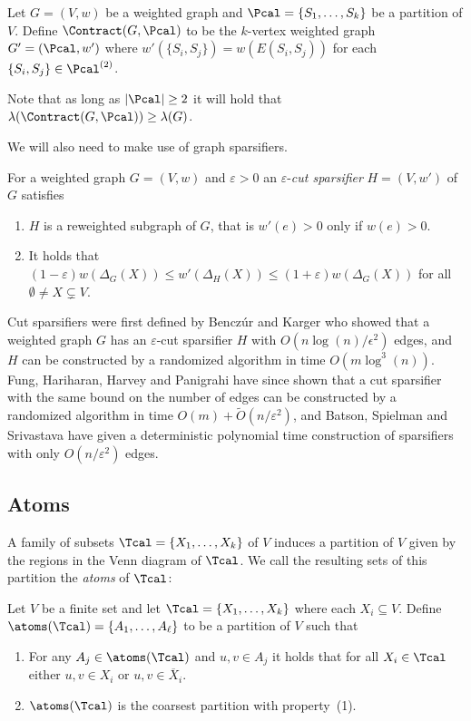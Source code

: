 \begin{definition}
Let $G = (V,w)$ be a weighted graph and $\Pcal = \{S_1, \ldots, S_k\}$ be a partition of $V$.  Define $\Contract(G,\Pcal)$ to be 
the $k$-vertex weighted graph $G' = (\Pcal, w')$ where $w'(\{S_i,S_j\}) = w(E(S_i,S_j))$
for each $\{S_i, S_j\} \in \Pcal^{(2)}$.
\end{definition}
\noindent
Note that as long as $|\Pcal| \ge 2$ it will hold that $\lambda(\Contract(G,\Pcal)) \ge \lambda(G)$.  

We will also need to make use of graph sparsifiers. 
\begin{definition}
 For a weighted graph $G = (V,w)$ and $\varepsilon > 0$ an $\varepsilon$-\emph{cut sparsifier} $H = (V,w')$ of $G$ 
satisfies 
\begin{enumerate}
\item $H$ is a reweighted subgraph of $G$, that is $w'(e) > 0$ only if $w(e) > 0$.
\item It holds that $(1-\varepsilon) w(\Delta_G(X)) \le w'(\Delta_H(X)) \le (1+\varepsilon) w(\Delta_G(X))$ for all $\emptyset \neq X \subsetneq V$.
\end{enumerate}
\end{definition}
Cut sparsifiers were first defined by Bencz\'{u}r and Karger \cite{BK15} who showed that a weighted graph $G$ has an $\varepsilon$-cut sparsifier $H$ 
with $O(n \log(n)/\epsilon^2)$ edges, and $H$ can be constructed by a randomized algorithm in time $O(m \log^3(n))$.  
Fung, Hariharan, Harvey and Panigrahi \cite{FHHP19} have since shown that a cut sparsifier with the same bound on the number of edges can be constructed 
by a randomized algorithm in time $O(m) + \tilde O(n/\varepsilon^2)$, and Batson, Spielman and Srivastava \cite{BSS12} have given a deterministic 
polynomial time construction of sparsifiers with only $O(n/\varepsilon^2)$ edges.

\subsection{Atoms}
A family of subsets $\Tcal = \{X_1,\ldots,X_k\}$ of $V$ induces a partition of $V$ given by the regions in the Venn diagram of $\Tcal$.
We call the resulting sets of this partition the \emph{atoms} of $\Tcal$:
\begin{definition}[Atoms]
Let $V$ be a finite set and let $\Tcal = \{X_1, \ldots, X_k\}$ where each $X_i  \subseteq V$.  Define $\atoms(\Tcal) = \{A_1, \ldots, A_\ell\}$ 
to be a partition of $V$ such that 
\begin{enumerate}
  \item For any $A_j \in \atoms(\Tcal)$ and $u,v \in A_j$ it holds that for all $X_i \in \Tcal$ either $u,v \in X_i$ or 
  $u,v \in \overline{X}_i$.
  \item $\atoms(\Tcal)$ is the coarsest partition with property~(1).
\end{enumerate}
\end{definition} 

